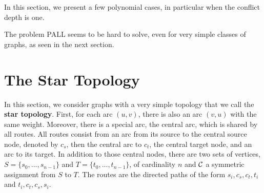 \documentclass[a4paper,10pt]{article}
\begin{document}
    In this section, we present a few polynomial cases, in particular when the conflict depth is one.
    
    
    The problem PALL seems to be hard to solve, even for very simple classes of graphs, as seen in the next section.
    
\section{The Star Topology}
  
   
    
      In this section, we consider graphs with a very simple topology that we call the {\bf star topology}. 
      First, for each arc $(u,v)$, there is also an arc $(v,u)$ with the same weight.
      Moreover, there is a special arc, the central arc, which is shared by all routes.
      All routes consist from an arc from its source to the central source node, denoted by {\bf $c_s$},
      then the central arc to {\bf $c_t$}, the central target node, and an arc to its target. In addition to those central nodes, there are two sets of vertices, $S=\{s_0,...,s_{n-1}\}$ and $T=\{t_0,...,t_{n-1}\}$, of cardinality $n$ and ${\cal C}$ a symmetric assignment from $S$ to $T$. 
      The routes are the directed paths of the form $s_i,c_s,c_t,t_i$ and $t_i,c_t,c_s,s_i$. 
      
      
       \begin{center}
	 

  \end{center}
	
\end{document}
